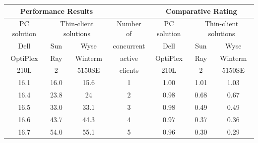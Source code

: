                 \begin{table}
                    \centering
                    \begin{tabular}{|c|c|c|c|c|c|c|}
                    \hline
                    \multicolumn{ 3}{|c|}{Performance Results} &            & \multicolumn{ 3}{|c|}{Comparative Rating} \\
                    \hline
                    PC solution & \multicolumn{ 2}{|c|}{Thin-client solutions} & Number of   & PC solution & \multicolumn{ 2}{|c|}{Thin-client solutions} \\
                    \hline
                        Dell   &        Sun &       Wyse & concurrent &     Dell   &        Sun &       Wyse \\

                      OptiPlex &        Ray &    Winterm &     active &   OptiPlex &        Ray &    Winterm \\

                          210L &          2 &     5150SE &    clients &       210L &          2 &     5150SE \\
                    \hline
                          16.1 &       16.0 &       15.6 &          1 &       1.00 &       1.01 &       1.03 \\
                    \hline
                          16.4 &       23.8 &         24 &          2 &       0.98 &       0.68 &       0.67 \\
                    \hline
                          16.5 &       33.0 &       33.1 &          3 &       0.98 &       0.49 &       0.49 \\
                    \hline
                          16.6 &       43.7 &       44.3 &          4 &       0.97 &       0.37 &       0.36 \\
                    \hline
                          16.7 &       54.0 &       55.1 &          5 &       0.96 &       0.30 &       0.29 \\
                    \hline
                    \end{tabular}  
                    \label{tab:table_pdf_test}
                \end{table}
                \pagebreak
                
